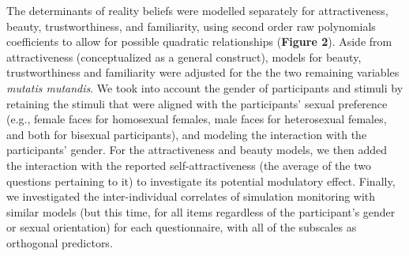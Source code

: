 \documentclass[
  man,mask,floatsintext]{apa6}
\begin{document}
The determinants of reality beliefs were modelled separately for attractiveness, beauty, trustworthiness, and familiarity, using second order raw polynomials coefficients to allow for possible quadratic relationships (\textbf{Figure 2}). Aside from attractiveness (conceptualized as a general construct), models for beauty, trustworthiness and familiarity were adjusted for the the two remaining variables \emph{mutatis mutandis}. We took into account the gender of participants and stimuli by retaining the stimuli that were aligned with the participants' sexual preference (e.g., female faces for homosexual females, male faces for heterosexual females, and both for bisexual participants), and modeling the interaction with the participants' gender. For the attractiveness and beauty models, we then added the interaction with the reported self-attractiveness (the average of the two questions pertaining to it) to investigate its potential modulatory effect. Finally, we investigated the inter-individual correlates of simulation monitoring with similar models (but this time, for all items regardless of the participant's gender or sexual orientation) for each questionnaire, with all of the subscales as orthogonal predictors.
\end{document}
